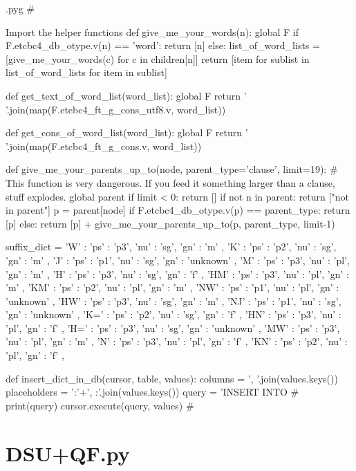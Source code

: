 \documentclass{report}
\makeatletter
\newenvironment{python}{%
  \VerbatimEnvironment
  \minted@resetoptions
  \setkeys{minted@opt}{}
      \begin{VerbatimOut}{\jobname.pyg}}
{%
      \end{VerbatimOut}
      \minted@pygmentize{python}
      \DeleteFile{\jobname.pyg}}
\makeatother
\begin{document}
\begin{python}
#{{{ Import the helper functions
def give_me_your_words(n):
        global F
        if F.etcbc4_db_otype.v(n) == 'word':
                return [n]
        else:
            list_of_word_lists = [give_me_your_words(c) for c in children[n]]
            return [item for sublist in list_of_word_lists for item in sublist]

def get_text_of_word_list(word_list):
        global F
        return ' '.join(map(F.etcbc4_ft_g_cons_utf8.v, word_list))

def get_cons_of_word_list(word_list):
        global F
        return ' '.join(map(F.etcbc4_ft_g_cons.v, word_list))

def give_me_your_parents_up_to(node, parent_type='clause', limit=19):
    # This function is very dangerous. If you feed it something larger than a clause, stuff explodes.
        global parent
        if limit < 0:
                return []
        if not n in parent:
                return ["not in parent"]
        p = parent[node]
        if F.etcbc4_db_otype.v(p) == parent_type:
                return [p]
        else:
                return [p] + give_me_your_parents_up_to(p, parent_type, limit-1)

suffix_dict = {
'W'   : { 'ps' : 'p3', 'nu' : 'sg', 'gn' : 'm' },
'K'   : { 'ps' : 'p2', 'nu' : 'sg', 'gn' : 'm' },
'J'   : { 'ps' : 'p1', 'nu' : 'sg', 'gn' : 'unknown' },
'M'   : { 'ps' : 'p3', 'nu' : 'pl', 'gn' : 'm' },
'H'   : { 'ps' : 'p3', 'nu' : 'sg', 'gn' : 'f' },
'HM'  : { 'ps' : 'p3', 'nu' : 'pl', 'gn' : 'm' },
'KM'  : { 'ps' : 'p2', 'nu' : 'pl', 'gn' : 'm' },
'NW'  : { 'ps' : 'p1', 'nu' : 'pl', 'gn' : 'unknown' },
'HW'  : { 'ps' : 'p3', 'nu' : 'sg', 'gn' : 'm' },
'NJ'  : { 'ps' : 'p1', 'nu' : 'sg', 'gn' : 'unknown' },
'K='  : { 'ps' : 'p2', 'nu' : 'sg', 'gn' : 'f' },
'HN'  : { 'ps' : 'p3', 'nu' : 'pl', 'gn' : 'f' },
'H='  : { 'ps' : 'p3', 'nu' : 'sg', 'gn' : 'unknown' },
'MW'  : { 'ps' : 'p3', 'nu' : 'pl', 'gn' : 'm' },
'N'   : { 'ps' : 'p3', 'nu' : 'pl', 'gn' : 'f' },
'KN'  : { 'ps' : 'p2', 'nu' : 'pl', 'gn' : 'f' },
}

def insert_dict_in_db(cursor, table, values):
        columns = ', '.join(values.keys())
        placeholders = ':'+', :'.join(values.keys())
        query = 'INSERT INTO %
#        print(query)
        cursor.execute(query, values)
#}}}
\end{python}

\chapter{DSU+QF.py}
\lstset{language=python,basicstyle=\ttfamily}
\end{document}

